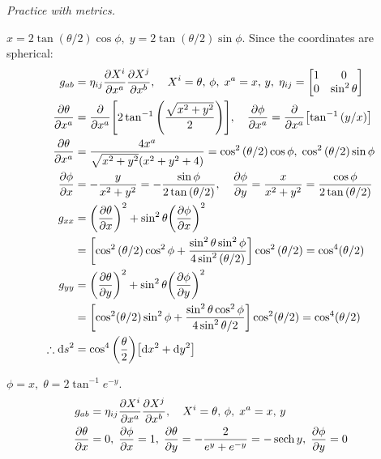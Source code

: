 \documentclass{report}
\begin{document}
\begin{subquests}
	\item \emph{Practice with metrics.}
	\begin{subquests}
		\item $x = 2\tan(\theta/2)\cos\phi,\; y = 2\tan(\theta/2)\sin\phi$. Since the coordinates are spherical:
		\begin{align*}
			g_{ab} & = \eta_{ij}\pdv{X^i}{x^a}\pdv{X^j}{x^b}, \quad X^i = \theta,\,\phi,\; x^a = x,\,y, \;\eta_{ij} = \mqty[1 & 0 \\ 0 & \sin^2\theta]  \\
			\pdv{\theta}{x^a} & = \pdv{x^a}\bqty{2\tan^{-1}\pqty{\frac{\sqrt{x^2 + y^2}}{2}}}, \quad \pdv{\phi}{x^a} = \pdv{x^a}\bqty{\tan^{-1}\pqty{y/x}} \\
			\pdv{\theta}{x^a} & = \frac{4x^a}{\sqrt{x^2 + y^2}\pqty{x^2 + y^2 + 4}} = \cos^2\pqty{\theta/2}\cos\phi,\;\cos^2\pqty{\theta/2}\sin\phi \\
			\quad \pdv{\phi}{x} & = -\frac{y}{x^2 + y^2} = -\frac{\sin\phi}{2\tan\pqty{\theta/2}}, \quad \pdv{\phi}{y}  = \frac{x}{x^2 + y^2} = \frac{\cos\phi}{2\tan\pqty{\theta/2}} \\
			g_{xx} & = \pqty{\pdv{\theta}{x}}^2 + \sin^2\theta\pqty{\pdv{\phi}{x}}^2 \\
			& = \bqty{\cos^2\pqty{\theta/2}\cos^2\phi + \frac{\sin^2\theta\sin^2\phi}{4\sin^2\pqty{\theta/2}}}\cos^2\pqty{\theta/2} = \cos^4(\theta/2) \\
			g_{yy} & = \pqty{\pdv{\theta}{y}}^2 + \sin^2\theta\pqty{\pdv{\phi}{y}}^2 \\
			& = \bqty{\cos^2(\theta/2)\sin^2\phi + \frac{\sin^2\theta\cos^2\phi}{4\sin^2{\theta/2}}}\cos^2(\theta/2) = \cos^4(\theta/2) \\
			\therefore \dd{s}^2 & = \cos^4\pqty{\frac{\theta}{2}}\bqty{\dd x^2 + \dd y^2}
		\end{align*}

		\item $\phi = x,\; \theta = 2\tan^{-1}e^{-y}$.
		\begin{align*}
			g_{ab} & = \eta_{ij}\pdv{X^i}{x^a}\pdv{X^j}{x^b}, \quad X^i = \theta,\,\phi,\; x^a = x,\,y \\
			\pdv{\theta}{x} & = 0,\;\pdv{\phi}{x} = 1,\;\pdv{\theta}{y} = -\frac{2}{e^{y} + e^{-y}} = -\sech y,\; \pdv{\phi}{y} = 0
		\end{align*}
	\end{subquests}
\end{subquests}
\end{document}
